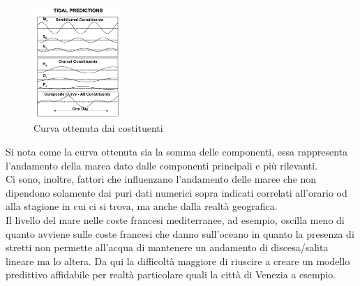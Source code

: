 \begin{figure}[H]
    \centering
    \includegraphics[width=0.3\textwidth]{res/cap 2/Tidal_constituent_sum.png}
    \caption{Curva ottenuta dai costituenti}
\end{figure}

Si nota come la curva ottenuta sia la somma delle componenti, essa rappresenta l'andamento della marea dato dalle componenti principali e più rilevanti.\\
Ci sono, inoltre, fattori che influenzano l'andamento delle maree che non dipendono solamente dai puri dati numerici sopra indicati correlati all'orario od alla stagione in cui ci si trova, ma anche dalla realtà geografica.\\
Il livello del mare nelle coste francesi mediterranee, ad esempio, oscilla meno di quanto avviene sulle coste francesi che danno sull'oceano in quanto la presenza di stretti non permette all'acqua di mantenere un andamento di discesa/salita lineare ma lo altera. Da qui la difficoltà maggiore di riuscire a creare un modello predittivo affidabile per realtà particolare quali la città di Venezia a esempio.
